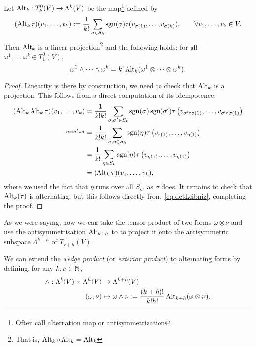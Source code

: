 \begin{proposition}
	Let $\operatorname{Alt}_k: T_k^0(V)\to \Lambda^k(V)$ be the map\footnote{Often call alternation map or antisymmetrization} defined by
	\begin{equation}
		(\operatorname{Alt}_k\tau)(v_1,\ldots,v_k) := \frac1{k!} \sum_{\sigma\in S_k} \operatorname{sgn}(\sigma) \tau(v_{\sigma(1)}, \ldots, v_{\sigma(k)}),
		\qquad \forall v_1,\ldots,v_k \in V.
	\end{equation}
	Then $\operatorname{Alt}_k$ is a linear projection\footnote{That is, $\operatorname{Alt}_k\circ\operatorname{Alt}_k = \operatorname{Alt}_k$} and the following holds:
	for all $\omega^1, \ldots, \omega^k \in T^0_1(V)$,
	\begin{equation}
		\omega^1 \wedge \cdots \wedge \omega^k = k! \operatorname{Alt}_k(\omega^1 \otimes \cdots \otimes \omega^k).
	\end{equation}
\end{proposition}
\begin{proof}
	Linearity is there by construction, we need to check that $\operatorname{Alt}_k$ is a projection.
	This follows from a direct computation of its idempotence:
	\begin{align}
		(\operatorname{Alt}_k \operatorname{Alt}_k \tau)(v_1,\ldots, v_k)
		 & = \frac1{k!k!}\sum_{\sigma,\sigma'\in S_k}\operatorname{sgn}(\sigma)\operatorname{sgn}(\sigma') \tau\left(v_{\sigma'\circ\sigma(1)}, \ldots, v_{\sigma'\circ\sigma(1)}\right) \\
		\overset{\eta = \sigma'\circ\sigma}{}
		 & =\frac1{k!k!}\sum_{\sigma,\eta\in S_k}\operatorname{sgn}(\eta) \tau\left(v_{\eta(1)}, \ldots, v_{\eta(1)}\right)                                                \\
		 & =\frac1{k!}\sum_{\eta\in S_k}\operatorname{sgn}(\eta) \tau\left(v_{\eta(1)}, \ldots, v_{\eta(1)}\right)                                                         \\
		 & =(\operatorname{Alt}_k \tau)(v_1,\ldots, v_k),
	\end{align}
	where we used the fact that $\eta$ runs over all $S_k$, as $\sigma$ does.
	It remains to check that $\operatorname{Alt}_k(\tau)$ is alternating, but this follows directly from~\eqref{eq:detLeibniz}, completing the proof.
\end{proof}

As we were saying, now we can take the tensor product of two forms $\omega\otimes\nu$ and use the antisymmetrisation $\operatorname{Alt}_{k+h}$ to to project it onto the antisymmetric subspace $\Lambda^{k+h}$ of $T_{k+h}^0(V)$.

\begin{definition}
	We can extend the \emph{wedge product} (or \emph{exterior product}) to alternating forms by defining, for any $k,h\in\mathbb{N}$,
	\begin{align}
		\wedge : \Lambda^k(V)\times\Lambda^h(V) & \to \Lambda^{k+h}(V)                                                         \\
		(\omega, \nu)                           & \mapsto \omega\wedge\nu := \frac{(k+h)!}{k!h!} \operatorname{Alt}_{k+h}(\omega\otimes\nu).
	\end{align}
\end{definition}

